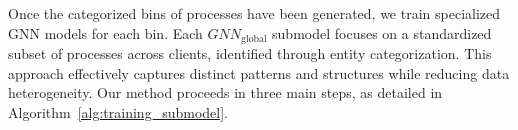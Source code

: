 


Once the categorized bins of processes have been generated, we train specialized GNN models for each bin. Each \({GNN}_{\text{global}}\) submodel focuses on a standardized subset of processes across clients, identified through entity categorization. This approach effectively captures distinct patterns and structures while reducing data heterogeneity. Our method proceeds in three main steps, as detailed in Algorithm~\ref{alg:training_submodel}.

